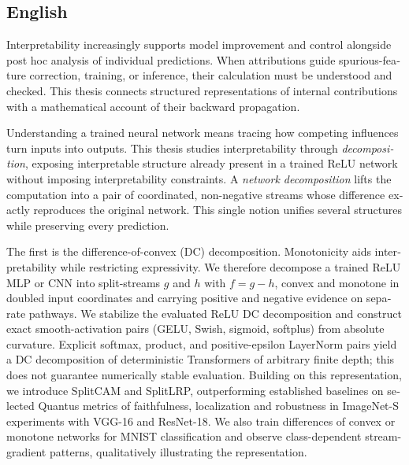 \begin{otherlanguage}{english}
\section*{English}
Interpretability increasingly supports model improvement and control alongside post hoc analysis of individual predictions. When attributions guide spurious-feature correction, training, or inference, their calculation must be understood and checked. This thesis connects structured representations of internal contributions with a mathematical account of their backward propagation.

Understanding a trained neural network means tracing how competing influences turn inputs into outputs. This thesis studies interpretability through \emph{decomposition}, exposing interpretable structure already present in a trained ReLU network without imposing interpretability constraints. A \emph{network decomposition} lifts the computation into a pair of coordinated, non-negative streams whose difference exactly reproduces the original network. This single notion unifies several structures while preserving every prediction.

The first is the difference-of-convex (DC) decomposition. Monotonicity aids interpretability while restricting expressivity. We therefore decompose a trained ReLU MLP or CNN into split-streams $g$ and $h$ with $f = g - h$, convex and monotone in doubled input coordinates and carrying positive and negative evidence on separate pathways. We stabilize the evaluated ReLU DC decomposition and construct exact smooth-activation pairs (GELU, Swish, sigmoid, softplus) from absolute curvature. Explicit softmax, product, and positive-epsilon LayerNorm pairs yield a DC decomposition of deterministic Transformers of arbitrary finite depth; this does not guarantee numerically stable evaluation. Building on this representation, we introduce SplitCAM and SplitLRP, outperforming established baselines on selected Quantus metrics of faithfulness, localization and robustness in ImageNet-S experiments with VGG-16 and ResNet-18. We also train differences of convex or monotone networks for MNIST classification and observe class-dependent stream-gradient patterns, qualitatively illustrating the representation.


\end{otherlanguage}
